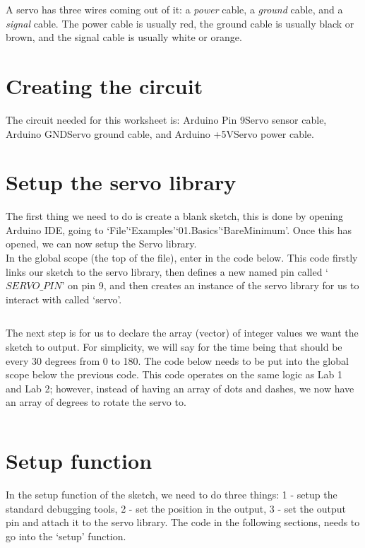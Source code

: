 \documentclass[11pt,a4paper]{article}
\begin{document}
\noindent
A servo has three wires coming out of it: a \textit{power} cable, a \textit{ground} cable, and a \textit{signal} cable. The power cable is usually red, the ground cable is usually black or brown, and the signal cable is usually white or orange.

\section{Creating the circuit}
The circuit needed for this worksheet is: Arduino Pin 9\textrightarrow Servo sensor cable, Arduino GND\textrightarrow Servo ground cable, and Arduino +5V\textrightarrow Servo power cable.\\

\section{Setup the servo library}
The first thing we need to do is create a blank sketch, this is done by opening Arduino IDE, going to `File'\textrightarrow `Examples'\textrightarrow `01.Basics'\textrightarrow `BareMinimum'. Once this has opened, we can now setup the Servo library.\\

\noindent
In the global scope (the top of the file), enter in the code below. This code firstly links our sketch to the servo library, then defines a new named pin called `$SERVO\_PIN$' on pin 9, and then creates an instance of the servo library for us to interact with called `servo'.\\
\vspace{-1.75em}
\inputminted{arduino}{./src/1-servo-library.txt}
\vspace{.75em}

\noindent
The next step is for us to declare the array (vector) of integer values we want the sketch to output. For simplicity, we will say for the time being that should be every 30 degrees from 0 to 180. The code below needs to be put into the global scope below the previous code. This code operates on the same logic as Lab 1 and Lab 2; however, instead of having an array of dots and dashes, we now have an array of degrees to rotate the servo to.\\
\vspace{-1.75em}
\inputminted{arduino}{./src/2-degree-list.txt}
\vspace{-.5em}

\section{Setup function}
In the setup function of the sketch, we need to do three things: 1 - setup the standard debugging tools, 2 - set the position in the output, 3 - set the output pin and attach it to the servo library. The code in the following sections, needs to go into the `setup' function.\\
\end{document}
